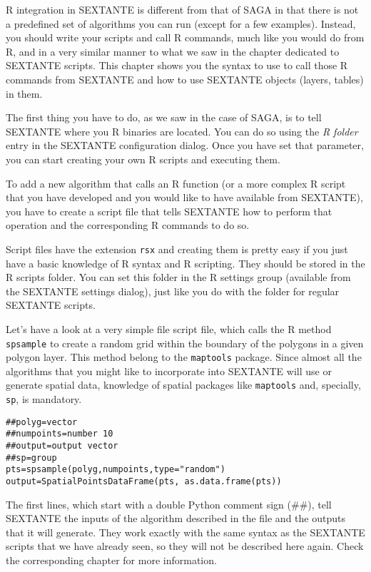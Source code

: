R integration in SEXTANTE is different from that of SAGA in that there is not a predefined set of algorithms you can run (except for a few examples). Instead, you should write your scripts and call R commands, much like you would do from R, and in a very similar manner to what we saw in the chapter dedicated to SEXTANTE scripts. This chapter shows you the syntax to use to call those R commands from SEXTANTE and how to use SEXTANTE objects (layers, tables) in them.

The first thing you have to do, as we saw in the case of SAGA, is to tell SEXTANTE where you R binaries are located. You can do so using the \emph{R folder} entry in the SEXTANTE configuration dialog. Once you have set that parameter, you can start creating your own R scripts and executing them.

To add a new algorithm that calls an R function (or a more complex R script that you have developed and you would like to have available from SEXTANTE), you have to create a script file that tells SEXTANTE how to perform that operation and the corresponding R commands to do so.

Script files have the extension \texttt{rsx} and creating them is pretty easy if you just have a basic knowledge of R syntax and R scripting. They should be stored in the R scripts folder. You can set this folder in the R settings group (available from the SEXTANTE settings dialog), just like you do with the folder for regular SEXTANTE scripts. 

Let's have a look at a very simple file script file, which calls the R method \texttt{spsample} to create a random grid within the boundary of the polygons in a given polygon layer. This method belong to the \texttt{maptools} package. Since almost all the algorithms that you might like to incorporate into SEXTANTE will use or generate spatial data, knowledge of spatial packages like \texttt{maptools} and, specially, \texttt{sp}, is mandatory.

\begin{verbatim}
##polyg=vector
##numpoints=number 10
##output=output vector
##sp=group
pts=spsample(polyg,numpoints,type="random")
output=SpatialPointsDataFrame(pts, as.data.frame(pts))
\end{verbatim}


The first lines, which start with a double Python comment sign (\#\#), tell SEXTANTE the inputs of the algorithm described in the file and the outputs that it will generate. They work exactly with the same syntax as the SEXTANTE scripts that we have already seen, so they will not be described here again. Check the corresponding chapter for more information.


